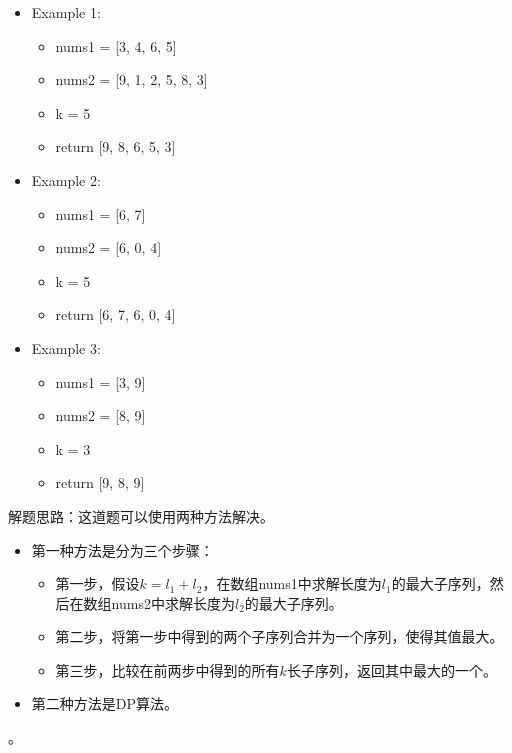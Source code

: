 \documentclass[a4paper,10pt]{article}
\begin{document}
\begin{itemize}
    \item Example 1:
        \begin{itemize}
            \item nums1 = [3, 4, 6, 5]
            \item nums2 = [9, 1, 2, 5, 8, 3]
            \item k = 5
            \item return [9, 8, 6, 5, 3]
        \end{itemize}
    \item Example 2:
        \begin{itemize}
            \item nums1 = [6, 7]
            \item nums2 = [6, 0, 4]
            \item k = 5
            \item return [6, 7, 6, 0, 4]
        \end{itemize}
    \item Example 3:
        \begin{itemize}
            \item nums1 = [3, 9]
            \item nums2 = [8, 9]
            \item k = 3
            \item return [9, 8, 9]
        \end{itemize}
\end{itemize}

\begin{CJK*}{UTF8}{gbsn}
\noindent 解题思路：这道题可以使用两种方法解决。
\begin{itemize}
    \item 第一种方法是分为三个步骤：
        \begin{itemize}
            \item 第一步，假设$k=l_1+l_2$，在数组nums1中求解长度为$l_1$的最大子序列，然后在数组nums2中求解长度为$l_2$的最大子序列。
            \item 第二步，将第一步中得到的两个子序列合并为一个序列，使得其值最大。
            \item 第三步，比较在前两步中得到的所有$k$长子序列，返回其中最大的一个。
        \end{itemize}
    
    \item 第二种方法是DP算法。
\end{itemize}
。
\end{CJK*}
\end{document}
